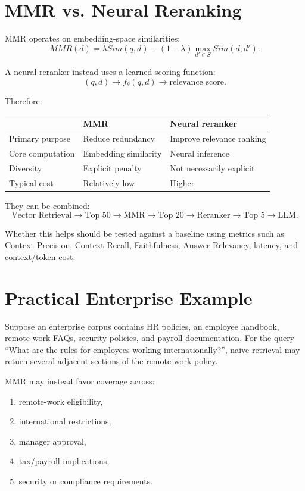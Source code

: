 \documentclass[12pt,a4paper]{article}
\begin{document}
\section{MMR vs. Neural Reranking}
MMR operates on embedding-space similarities:
\[
MMR(d)=\lambda Sim(q,d)-(1-\lambda)\max_{d'\in S}Sim(d,d').
\]

A neural reranker instead uses a learned scoring function:
\[
(q,d)\rightarrow f_\theta(q,d)\rightarrow\text{relevance score}.
\]

Therefore:
\begin{center}
\begin{tabular}{p{}p{}p{}}
\toprule
&MMR&Neural reranker\\\midrule
Primary purpose&Reduce redundancy&Improve relevance ranking\\
Core computation&Embedding similarity&Neural inference\\
Diversity&Explicit penalty&Not necessarily explicit\\
Typical cost&Relatively low&Higher\\
\bottomrule
\end{tabular}
\end{center}

They can be combined:
\[
\text{Vector Retrieval}\rightarrow\text{Top 50}\rightarrow\text{MMR}\rightarrow\text{Top 20}\rightarrow\text{Reranker}\rightarrow\text{Top 5}\rightarrow\text{LLM}.
\]

Whether this helps should be tested against a baseline using metrics such as Context Precision, Context Recall, Faithfulness, Answer Relevancy, latency, and context/token cost.

\section{Practical Enterprise Example}
Suppose an enterprise corpus contains HR policies, an employee handbook, remote-work FAQs, security policies, and payroll documentation. For the query ``What are the rules for employees working internationally?'', naive retrieval may return several adjacent sections of the remote-work policy.

MMR may instead favor coverage across:
\begin{enumerate}
\item remote-work eligibility,
\item international restrictions,
\item manager approval,
\item tax/payroll implications,
\item security or compliance requirements.
\end{enumerate}
\end{document}
